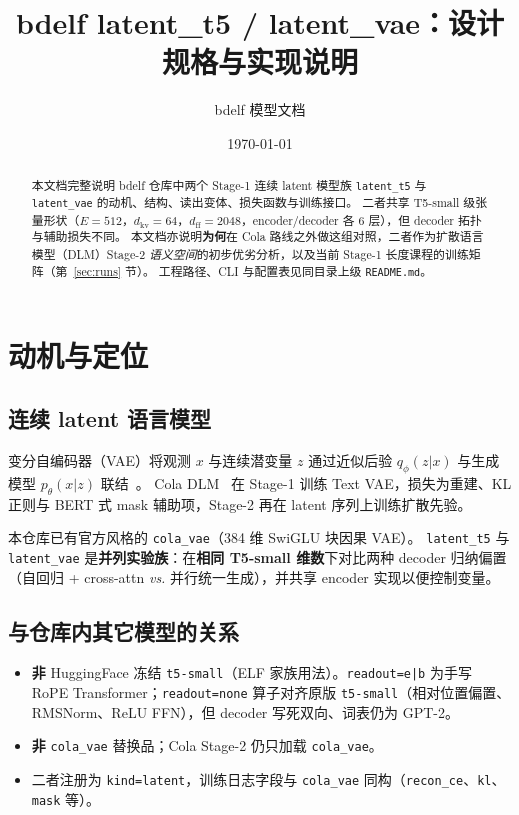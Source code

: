 \documentclass[UTF8,a4paper,11pt]{ctexart}
\title{bdelf latent\_t5 / latent\_vae：设计规格与实现说明}
\author{bdelf 模型文档}
\date{\today}
\begin{document}
\maketitle

\begin{abstract}
本文档完整说明 bdelf 仓库中两个 Stage-1 连续 latent 模型族 \texttt{latent\_t5} 与 \texttt{latent\_vae} 的动机、结构、读出变体、损失函数与训练接口。
二者共享 T5-small 级张量形状（$E{=}512$，$d_{\mathrm{kv}}{=}64$，$d_{\mathrm{ff}}{=}2048$，encoder/decoder 各 6 层），但 decoder 拓扑与辅助损失不同。
本文档亦说明\textbf{为何}在 Cola 路线之外做这组对照，二者作为扩散语言模型（DLM）Stage-2 \emph{语义空间}的初步优劣分析，以及当前 Stage-1 长度课程的训练矩阵（第~\ref{sec:runs} 节）。
工程路径、CLI 与配置表见同目录上级 \texttt{README.md}。
\end{abstract}

\section{动机与定位}

\subsection{连续 latent 语言模型}

变分自编码器（VAE）将观测 $x$ 与连续潜变量 $z$ 通过近似后验 $q_\phi(z|x)$ 与生成模型 $p_\theta(x|z)$ 联结~\cite{kingma2014auto}。
Cola DLM~\cite{cola2026dlm} 在 Stage-1 训练 Text VAE，损失为重建、KL 正则与 BERT 式 mask 辅助项，Stage-2 再在 latent 序列上训练扩散先验。

本仓库已有官方风格的 \texttt{cola\_vae}（384 维 SwiGLU 块因果 VAE）。
\texttt{latent\_t5} 与 \texttt{latent\_vae} 是\textbf{并列实验族}：在\textbf{相同 T5-small 维数}下对比两种 decoder 归纳偏置（自回归 + cross-attn \emph{vs.} 并行统一生成），并共享 encoder 实现以便控制变量。

\subsection{与仓库内其它模型的关系}

\begin{itemize}
  \item \textbf{非} HuggingFace 冻结 \texttt{t5-small}（ELF 家族用法）。\texttt{readout=e|b} 为手写 RoPE Transformer；\texttt{readout=none} 算子对齐原版 \texttt{t5-small}（相对位置偏置、RMSNorm、ReLU FFN），但 decoder 写死双向、词表仍为 GPT-2。
  \item \textbf{非} \texttt{cola\_vae} 替换品；Cola Stage-2 仍只加载 \texttt{cola\_vae}。
  \item 二者注册为 \texttt{kind=latent}，训练日志字段与 \texttt{cola\_vae} 同构（\texttt{recon\_ce}、\texttt{kl}、\texttt{mask} 等）。
\end{itemize}
\end{document}
